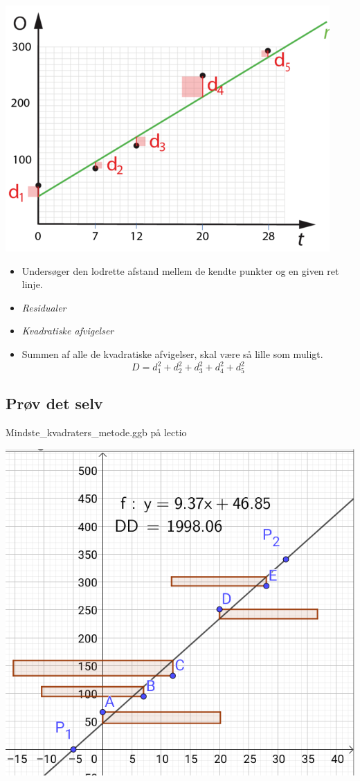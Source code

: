 \documentclass[11pt]{article}
\begin{document}
\begin{center}
\includegraphics[width=.9\linewidth]{img/screenshot_2019-09-05_10-23-36.png}
\end{center}
\begin{itemize}
\item Undersøger den lodrette afstand mellem de kendte punkter og en given ret linje.
\item \emph{Residualer}
\item \emph{Kvadratiske afvigelser}
\item Summen af alle de kvadratiske afvigelser, skal være så lille som muligt. $$D=d_1^2 + d_2^2 + d_3^2 + d_4^2 + d_5^2$$
\end{itemize}

\subsection*{Prøv det selv}
\label{sec:orge4805aa}

Mindste\_kvadraters\_metode.ggb på lectio

\begin{center}
\includegraphics[width=.9\linewidth]{img/screenshot_2019-09-05_10-39-25.png}
\end{center}
\end{document}
